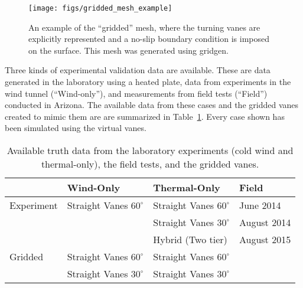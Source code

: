  \begin{figure}[!htb]
   \begin{center}
    \texttt{[image: figs/gridded\_mesh\_example]}
    \caption{An example of the ``gridded'' mesh, where the turning vanes
    are explicitly represented and a no-slip boundary condition is
    imposed on the surface. This mesh was generated using gridgen.} 
    \label{fig:gridded_mesh}
   \end{center}
 \end{figure}

Three kinds of experimental validation data are available. These are
data generated in the laboratory using a heated plate, data from
experiments in the wind tunnel (``Wind-only''), and measurements from field
tests (``Field'') conducted in Arizona. The available data from
these cases and the gridded vanes created to mimic them are are
summarized in Table~\ref{tab:val_data}. Every case shown has been
simulated using the virtual vanes.   

\begin{table}[h]
\centering
\label{my-label}
\begin{tabular}{l|l|l|l|}
           & Wind-Only                   & Thermal-Only                & Field  \\
  \hline 
Experiment & Straight Vanes $60^{\circ}$ & Straight Vanes $60^{\circ}$ & June 2014   \\
           &                           & Straight Vanes $30^{\circ}$   & August 2014 \\
           &                           & Hybrid (Two tier)             & August 2015 \\
  \hline 
Gridded    & Straight Vanes $60^{\circ}$ & Straight Vanes $60^{\circ}$ & \\
           & Straight Vanes $30^{\circ}$ & Straight Vanes $30^{\circ}$ & \\
  \hline 
\end{tabular}
  \caption{Available truth data from the laboratory experiments 
    (cold wind and thermal-only), the field tests, and the gridded
 vanes.}  
  \label{tab:val_data}
\end{table}
%
%
%
%
%


%
%
